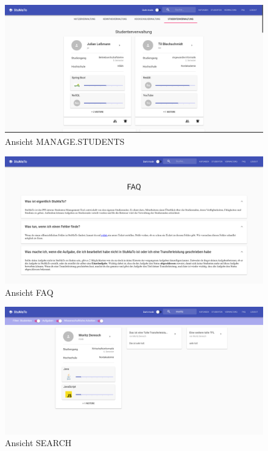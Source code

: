 \documentclass[
  12pt,
  ngerman,
  a4paper,
]{article}
\begin{document}
\begin{figure}
\centering
\includegraphics{./tex2pdf.-930e6666e1221838/829b0f3718891f438baaea67cf289ebd999fa92d.png}
\caption{Ansicht MANAGE.STUDENTS}
\end{figure}

\begin{figure}
\centering
\includegraphics{./tex2pdf.-930e6666e1221838/9ec75c8fe138681c3d2ae6b2dae0f67a3a0aeba6.png}
\caption{Ansicht FAQ}
\end{figure}

\begin{figure}
\centering
\includegraphics{./tex2pdf.-930e6666e1221838/b8df625acab593f077a2984960b30c10283f420a.png}
\caption{Ansicht SEARCH}
\end{figure}
\end{document}
